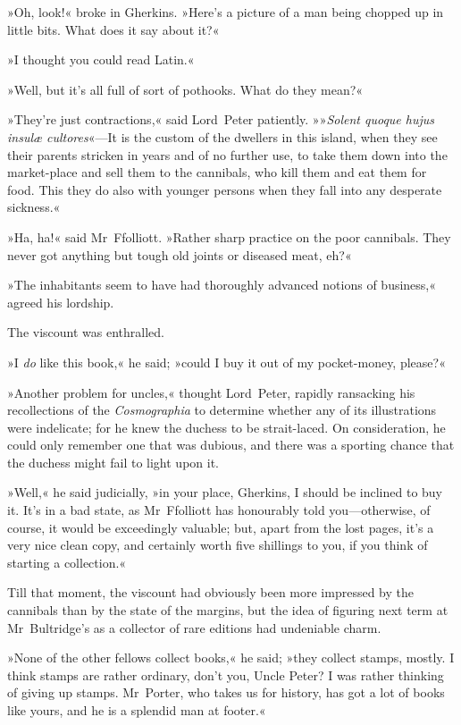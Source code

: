 »Oh, look!« broke in Gherkins. »Here's a picture of a man being chopped up in little bits. What does it say about it?«

»I thought you could read Latin.«

»Well, but it's all full of sort of pothooks. What do they mean?«

»They're just contractions,« said Lord~Peter patiently. »»\textit{Solent quoque hujus insulæ cultores}«—It is the custom of the dwellers in this island, when they see their parents stricken in years and of no further use, to take them down into the market-place and sell them to the cannibals, who kill them and eat them for food. This they do also with younger persons when they fall into any desperate sickness.«

»Ha, ha!« said Mr~Ffolliott. »Rather sharp practice on the poor cannibals. They never got anything but tough old joints or diseased meat, eh?«

»The inhabitants seem to have had thoroughly advanced notions of business,« agreed his lordship.

The viscount was enthralled.

»I \textit{do} like this book,« he said; »could I buy it out of my pocket-money, please?«

»Another problem for uncles,« thought Lord~Peter, rapidly ransacking his recollections of the \textit{Cosmographia} to determine whether any of its illustrations were indelicate; for he knew the duchess to be strait-laced. On consideration, he could only remember one that was dubious, and there was a sporting chance that the duchess might fail to light upon it.

»Well,« he said judicially, »in your place, Gherkins, I should be inclined to buy it. It's in a bad state, as Mr~Ffolliott has honourably told you—otherwise, of course, it would be exceedingly valuable; but, apart from the lost pages, it's a very nice clean copy, and certainly worth five shillings to you, if you think of starting a collection.«

Till that moment, the viscount had obviously been more impressed by the cannibals than by the state of the margins, but the idea of figuring next term at Mr~Bultridge's as a collector of rare editions had undeniable charm.

»None of the other fellows collect books,« he said; »they collect stamps, mostly. I think stamps are rather ordinary, don't you, Uncle Peter? I was rather thinking of giving up stamps. Mr~Porter, who takes us for history, has got a lot of books like yours, and he is a splendid man at footer.«

